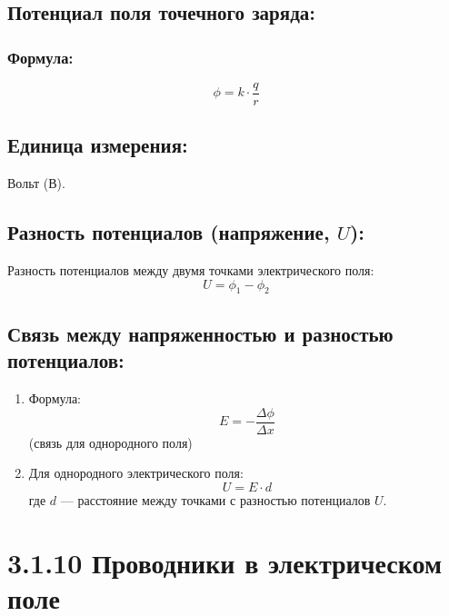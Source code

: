 \documentclass[a4paper,12pt]{article}
\begin{document}
\vspace{-9pt}
\subsection*{Потенциал поля точечного заряда:}
\vspace{-3pt}
\subsubsection*{Формула:}
$$ \phi = k \cdot \frac{q}{r} $$

\vspace{-9pt}
\subsection*{Единица измерения:}
\vspace{-3pt}
Вольт (В).

\vspace{-9pt}
\subsection*{Разность потенциалов (напряжение, $U$):}
\vspace{-3pt}
Разность потенциалов между двумя точками электрического поля:
\vspace{-0.05em}
$$ U = \phi_1 - \phi_2 $$

\vspace{-9pt}
\subsection*{Связь между напряженностью и разностью потенциалов:}
\vspace{-3pt}
\begin{enumerate}[itemsep=0pt, topsep=0pt, parsep=3pt]
    \item Формула:
    \vspace{-0.05em}
    $$ E = - \frac{\Delta \phi}{\Delta x} $$
    (связь для однородного поля)
    \item Для однородного электрического поля:
    \vspace{-0.05em}
    $$ U = E \cdot d $$
    где $d$ — расстояние между точками с разностью потенциалов $U$.
\end{enumerate}

\section*{3.1.10 Проводники в электрическом поле}
\vspace{-9pt}
\end{document}
